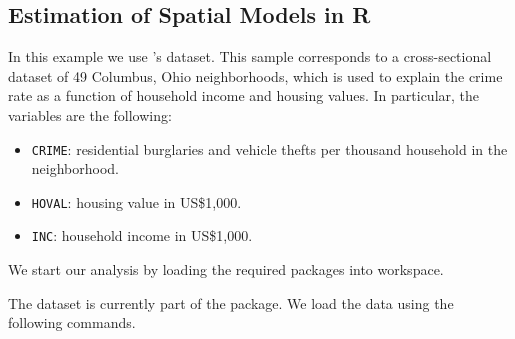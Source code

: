 \subsection{Estimation of Spatial Models in R}

In this example we use \cite{anselin1988spatial}'s dataset. This sample corresponds to a cross-sectional dataset of 49 Columbus, Ohio neighborhoods, which is used to explain the crime rate as  a function of household income and housing values. In particular, the variables  are the following:

\begin{itemize}
  \item \texttt{CRIME}: residential burglaries and vehicle thefts per thousand household in the neighborhood.
  \item \texttt{HOVAL}: housing value in US\$1,000.
  \item \texttt{INC}: household income in US\$1,000.
\end{itemize}

We start our analysis by loading the required packages into  workspace.

\begin{knitrout}
\color{fgcolor}\begin{kframe}
\begin{alltt}
\hlstd{(}\hlstd{)}
\hlstd{(}\hlstd{)}
\hlstd{(}\hlstd{)}            
\hlstd{(}\hlstd{)}
\hlstd{(}\hlstd{)}
\hlstd{(}\hlstd{)}
\hlstd{(}\hlstd{)} 
\end{alltt}
\end{kframe}
\end{knitrout}

The dataset is currently part of the  package. We load the data using the following commands.

\begin{knitrout}
\color{fgcolor}\begin{kframe}
\begin{alltt}
   \hlkwb{<-} \hlstd{(}\hlstd{(}\hlstd{,}
                                       \hlstd{=} \hlstd{)[}\hlstd{])}
 \hlkwb{<-} \hlstd{(}\hlstd{(}\hlstd{,}
                                    \hlstd{=} \hlstd{)[}\hlstd{])}
\end{alltt}
\end{kframe}
\end{knitrout}

